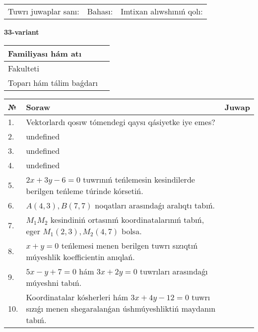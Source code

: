 \documentclass{article}
\begin{document}
\vspace{0.7cm}

\begin{tabular}{lll}
Tuwrı juwaplar sanı: \underline{\hspace{1cm}} & 
Bahası: \underline{\hspace{1cm}} & 
Imtixan alıwshınıń qolı: \underline{\hspace{2cm}} \\
\end{tabular}

\egroup

\newpage


\textbf{33-variant}\\

\bgroup
\def\arraystretch{1.6} %

\begin{tabular}{|m{5.7cm}|m{9.5cm}|}
\hline
Familiyası hám atı & \\
\hline
Fakulteti  & \\
\hline
Toparı hám tálim baǵdarı  & \\
\hline
\end{tabular}

\vspace{0.7cm}

\begin{tabular}{|m{0.7cm}|m{10cm}|m{4cm}|}
\hline
№ & Soraw & Juwap \\
\hline
1. & Vektorlardı qosıw tómendegi qaysı qásiyetke iye emes? &  \\
\hline
2. & undefined &  \\
\hline
3. & undefined &  \\
\hline
4. & undefined &  \\
\hline
5. & \(2 x + 3 y - 6 = 0\) tuwrınıń teńlemesin kesindilerde berilgen teńleme túrinde kórsetiń. &  \\
\hline
6. & \(A (4, 3), B (7, 7)\) noqatları arasındaǵı aralıqtı tabıń. &  \\
\hline
7. & \(M_{1}M_{2}\) kesindiniń ortasınıń koordinatalarınıń tabıń, eger \(M_{1} (2, 3), M_{2} (4, 7)\) bolsa. &  \\
\hline
8. & \(x + y = 0\) teńlemesi menen berilgen tuwrı sızıqtıń múyeshlik koefficientin anıqlań. &  \\
\hline
9. & \(5 x - y + 7 = 0\) hám \(3 x + 2 y = 0\) tuwrıları arasındaǵı múyeshni tabıń. &  \\
\hline
10. & Koordinatalar kósherleri hám \( 3 x + 4 y - 12 = 0 \) tuwrı sızıǵı menen shegaralanǵan úshmúyeshliktiń maydanın tabıń. & \\
\hline
\end{tabular}
\end{document}
